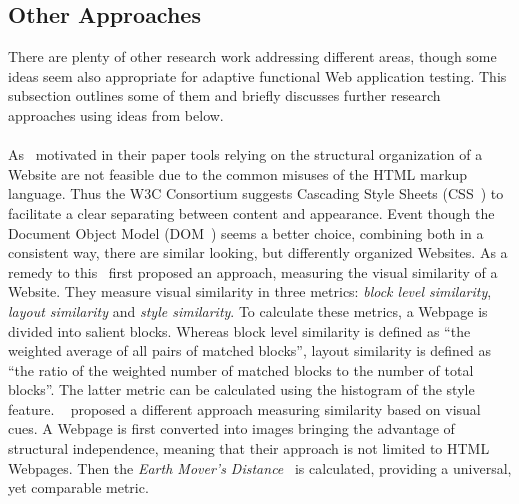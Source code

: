 \documentclass[12pt, notitlepage]{article}
\begin{document}
\subsection{Other Approaches}
There are plenty of other research work addressing different areas, though some ideas seem also appropriate for adaptive functional
Web application testing. This subsection outlines some of them and briefly discusses further research approaches using ideas from
below.\\\\
As~\citet{page-analysis_visual} motivated in their paper tools relying on the structural organization of a
Website are not feasible due to the common misuses of the HTML markup language. Thus the W3C Consortium suggests Cascading Style Sheets (CSS~\cite{css3}) to facilitate a clear separating between content and appearance. Event though the Document Object Model (DOM~\cite{dom})
seems a better choice, combining both in a consistent way, there are similar looking, but differently organized Websites.  
As a remedy to this~\citet{phishing-visual} first proposed an approach, measuring the visual similarity of a Website.
They measure visual similarity in three metrics: \textit{block level similarity}, \textit{layout similarity} and
\textit{style similarity}. To calculate these metrics, a Webpage is divided into salient blocks. Whereas block level similarity is defined as \enquote{the weighted average of all pairs of matched blocks}, layout similarity is defined as \enquote{the ratio of the weighted number
of matched blocks to the number of total blocks}. The latter metric can be calculated using the histogram of the style feature. 
~\citet{emd} proposed a different approach measuring similarity based on visual cues. A Webpage is first converted into 
images bringing the advantage of structural independence, meaning that their approach is not limited to HTML Webpages. Then the
\textit{Earth Mover's Distance}~\cite{emd-def} is calculated, providing a universal, yet comparable metric. 
\end{document}
